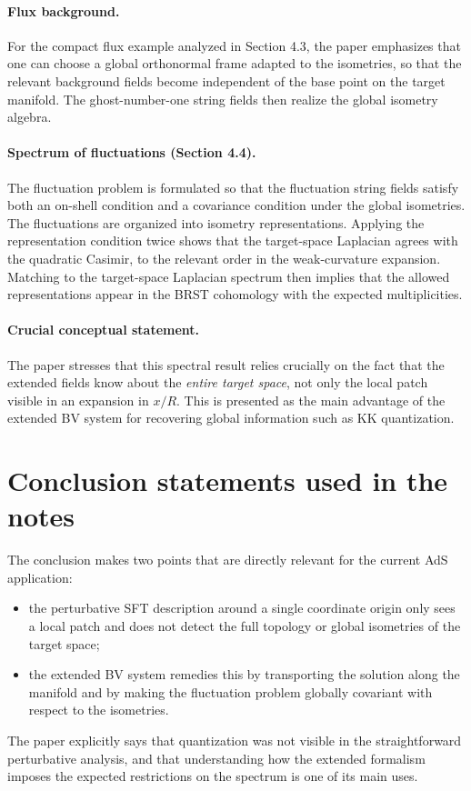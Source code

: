 \documentclass[12pt]{article}
\begin{document}
\paragraph{Flux background.}
For the compact flux example analyzed in Section 4.3, the paper emphasizes that one can choose a global
orthonormal frame adapted to the isometries, so that the relevant background fields become independent of
the base point on the target manifold.  The ghost-number-one string fields then realize the global
isometry algebra.

\paragraph{Spectrum of fluctuations (Section 4.4).}
The fluctuation problem is formulated so that the fluctuation string fields satisfy both an on-shell
condition and a covariance condition under the global isometries.  The fluctuations are organized into
isometry representations.  Applying the representation condition twice shows that the target-space
Laplacian agrees with the quadratic Casimir, to the relevant order in the weak-curvature expansion.
Matching to the target-space Laplacian spectrum then implies that the allowed representations appear in the
BRST cohomology with the expected multiplicities.

\paragraph{Crucial conceptual statement.}
The paper stresses that this spectral result relies crucially on the fact that the extended fields know
about the \emph{entire target space}, not only the local patch visible in an expansion in $x/R$.  This is
presented as the main advantage of the extended BV system for recovering global information such as KK
quantization.

\section*{Conclusion statements used in the notes}

The conclusion makes two points that are directly relevant for the current AdS application:
\begin{itemize}
\item the perturbative SFT description around a single coordinate origin only sees a local patch and does
      not detect the full topology or global isometries of the target space;
\item the extended BV system remedies this by transporting the solution along the manifold and by making
      the fluctuation problem globally covariant with respect to the isometries.
\end{itemize}
The paper explicitly says that quantization was not visible in the straightforward perturbative analysis,
and that understanding how the extended formalism imposes the expected restrictions on the spectrum is one
of its main uses.
\end{document}
